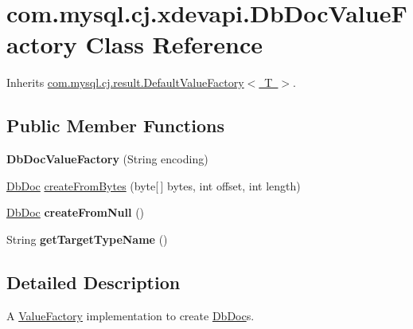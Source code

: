 \hypertarget{classcom_1_1mysql_1_1cj_1_1xdevapi_1_1_db_doc_value_factory}{}\section{com.\+mysql.\+cj.\+xdevapi.\+Db\+Doc\+Value\+Factory Class Reference}
\label{classcom_1_1mysql_1_1cj_1_1xdevapi_1_1_db_doc_value_factory}


Inherits \mbox{\hyperlink{classcom_1_1mysql_1_1cj_1_1result_1_1_default_value_factory}{com.\+mysql.\+cj.\+result.\+Default\+Value\+Factory$<$ T $>$}}.

\subsection*{Public Member Functions}
\begin{DoxyCompactItemize}
\item 
\mbox{\label{classcom_1_1mysql_1_1cj_1_1xdevapi_1_1_db_doc_value_factory_a7d4fdd157d809bf35ba333c8b4200713}} 
{\bfseries Db\+Doc\+Value\+Factory} (String encoding)
\item 
\mbox{\hyperlink{interfacecom_1_1mysql_1_1cj_1_1xdevapi_1_1_db_doc}{Db\+Doc}} \mbox{\hyperlink{classcom_1_1mysql_1_1cj_1_1xdevapi_1_1_db_doc_value_factory_a9c915537c139a6430520b8a0b92d461e}{create\+From\+Bytes}} (byte\mbox{[}$\,$\mbox{]} bytes, int offset, int length)
\item 
\mbox{\label{classcom_1_1mysql_1_1cj_1_1xdevapi_1_1_db_doc_value_factory_aac55d0e29aad7c0176b3c9d6a95b55f6}} 
\mbox{\hyperlink{interfacecom_1_1mysql_1_1cj_1_1xdevapi_1_1_db_doc}{Db\+Doc}} {\bfseries create\+From\+Null} ()
\item 
\mbox{\label{classcom_1_1mysql_1_1cj_1_1xdevapi_1_1_db_doc_value_factory_af2ac0c4c05e6606e87b045f8eaed3f1e}} 
String {\bfseries get\+Target\+Type\+Name} ()
\end{DoxyCompactItemize}


\subsection{Detailed Description}
A \mbox{\hyperlink{}{Value\+Factory}} implementation to create \mbox{\hyperlink{interfacecom_1_1mysql_1_1cj_1_1xdevapi_1_1_db_doc}{Db\+Doc}}s. 

